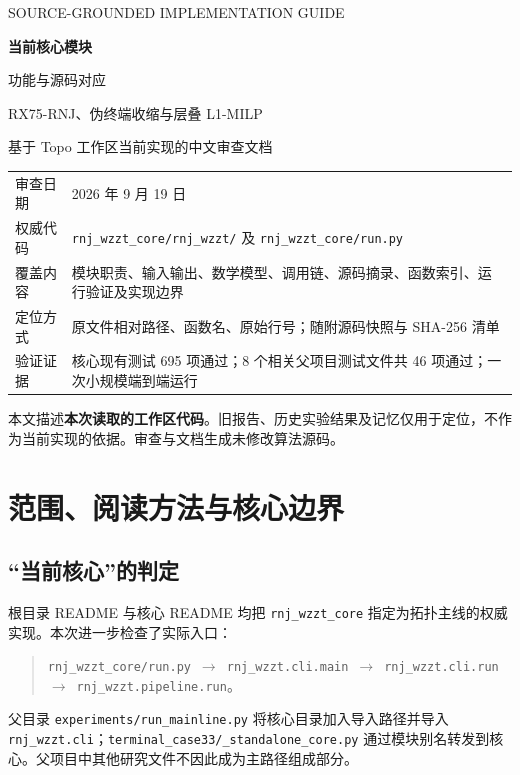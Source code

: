 \documentclass[UTF8,11pt,a4paper,fontset=windows]{ctexart}
\begin{document}
\begin{titlepage}
\vspace*{2cm}
{\color{accent}\large SOURCE-GROUNDED IMPLEMENTATION GUIDE\par}
\vspace{0.8cm}
{\Huge\bfseries\color{ink}当前核心模块\par 功能与源码对应\par}
\vspace{1cm}
{\Large RX75-RNJ、伪终端收缩与层叠 L1-MILP\par}
\vspace{0.6cm}
{\large 基于 Topo 工作区当前实现的中文审查文档\par}
\vspace{1.3cm}
\noindent\begin{tabularx}{\textwidth}{P{2.5cm}X}
\toprule
审查日期 & 2026 年 9 月 19 日\\
权威代码 & \nolinkurl{rnj_wzzt_core/rnj_wzzt/} 及 \nolinkurl{rnj_wzzt_core/run.py}\\
覆盖内容 & 模块职责、输入输出、数学模型、调用链、源码摘录、函数索引、运行验证及实现边界\\
定位方式 & 原文件相对路径、函数名、原始行号；随附源码快照与 SHA-256 清单\\
验证证据 & 核心现有测试 695 项通过；8 个相关父项目测试文件共 46 项通过；一次小规模端到端运行\\
\bottomrule
\end{tabularx}
\vfill
\noindent 本文描述\textbf{本次读取的工作区代码}。旧报告、历史实验结果及记忆仅用于定位，不作为当前实现的依据。审查与文档生成未修改算法源码。
\end{titlepage}

\begin{abstract}
当前核心实现的是一个本地 Python 仿真与辨识流程：从径向终端负荷网络生成含噪 AC 量测，拟合多场景 R/X 灵敏度，形成归一化共享路径分数，用 RNJ 生成层次和边界块，必要时收缩为伪终端，再用具有一步最优性检查的层叠 L1-MILP 构建模型路径，并用独立模拟复制上的验证误差选择模型。本文将每项功能映射到实际函数和代码行，明确默认执行路径与保留的研究工具，并记录本次实际测试结果。特别区分凸回归可行性、树结构表示、bootstrap 稳定性、候选域最优性及真实拓扑恢复五种不同含义。
\end{abstract}
\tableofcontents
\clearpage

\section{范围、阅读方法与核心边界}
\subsection{“当前核心”的判定}
根目录 README 与核心 README 均把 \nolinkurl{rnj_wzzt_core} 指定为拓扑主线的权威实现。本次进一步检查了实际入口：
\begin{quote}
\nolinkurl{rnj_wzzt_core/run.py}\ $\to$\ \nolinkurl{rnj_wzzt.cli.main}\ $\to$\ \nolinkurl{rnj_wzzt.cli.run}\ $\to$\ \nolinkurl{rnj_wzzt.pipeline.run}。
\end{quote}
父目录 \nolinkurl{experiments/run_mainline.py} 将核心目录加入导入路径并导入 \nolinkurl{rnj_wzzt.cli}；\nolinkurl{terminal_case33/_standalone_core.py} 通过模块别名转发到核心。父项目中其他研究文件不因此成为主路径组成部分。
\end{document}
